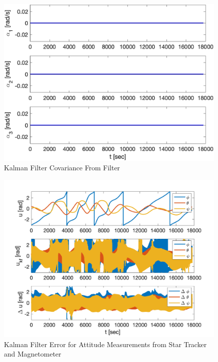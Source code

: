 \begin{figure}[H]
    \centering
    \captionsetup{ justification = centering }
    \includegraphics[width = 12cm]{Images/PS8/kalman_filter_meas_update_att_cov_bounds.png}
    \caption{Kalman Filter Covariance From Filter}
    \label{fig:kalman_att_cov}
\end{figure}

\begin{figure}[H]
    \centering
    \captionsetup{ justification = centering }
    \includegraphics[width = 12cm]{Images/PS8/kalman_filter_meas_update_error_attitude.png}
    \caption{Kalman Filter Error for Attitude Measurements from Star Tracker and Magnetometer}
    \label{fig:kalman_error_attitude}
\end{figure}

